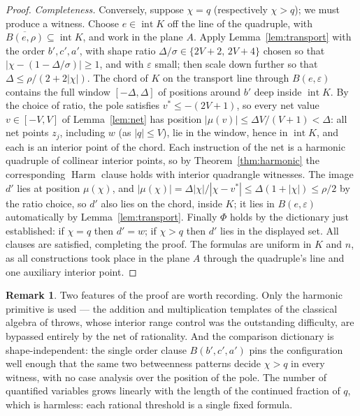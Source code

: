 \documentclass[11pt]{amsart}
\theoremstyle{definition}
\newtheorem{remark}[theorem]{Remark}
\newcommand{\Harm}{\operatorname{Harm}}
\newcommand{\interior}{\operatorname{int}}
\begin{document}
\begin{proof}
\emph{Completeness.} Conversely, suppose $\chi=q$ \textup(respectively
$\chi>q$\textup); we must produce a witness. Choose $e\in\interior K$ off the
line of the quadruple, with $\overline{B(e,\rho)}\subseteq\interior K$, and
work in the plane $A$. Apply Lemma~\ref{lem:transport} with the order
$b',c',a'$, with shape ratio $\Delta/\sigma\in\{2V+2,\,2V+4\}$ chosen so
that $|\chi-(1-\Delta/\sigma)|\ge1$, and with $\varepsilon$ small; then
scale down further so that $\Delta\le\rho/(2+2|\chi|)$. The chord of $K$
on the transport line through $B(e,\varepsilon)$ contains the full window
$[-\Delta,\Delta]$ of positions around $b'$ deep inside $\interior K$. By the
choice of ratio, the pole satisfies $v^{*}\le-(2V+1)$, so every net value
$v\in[-V,V]$ of Lemma~\ref{lem:net} has position
$|\mu(v)|\le\Delta V/(V+1)<\Delta$: all net points $z_j$, including $w$
\textup(as $|q|\le V$\textup), lie in the window, hence in $\interior K$,
and each is an interior point of the chord. Each instruction of the net is a
harmonic quadruple of collinear interior points, so by
Theorem~\ref{thm:harmonic} the corresponding $\Harm$ clause holds with
interior quadrangle witnesses. The image $d'$ lies at position $\mu(\chi)$,
and $|\mu(\chi)|=\Delta|\chi|/|\chi-v^{*}|\le\Delta(1+|\chi|)\le\rho/2$
by the ratio choice, so $d'$ also lies on the chord, inside $K$; it lies in
$B(e,\varepsilon)$ automatically by Lemma~\ref{lem:transport}. Finally
$\Phi$ holds by the dictionary just established: if $\chi=q$ then
$d'=w$; if $\chi>q$ then $d'$ lies in the displayed set. All clauses are
satisfied, completing the proof. The formulas are uniform in $K$ and $n$,
as all constructions took place in the plane $A$ through the quadruple's
line and one auxiliary interior point.
\end{proof}

\begin{remark}
Two features of the proof are worth recording. Only the harmonic primitive is
used --- the addition and multiplication templates of the classical algebra of
throws, whose interior range control was the outstanding difficulty, are
bypassed entirely by the net of rationality. And the comparison dictionary is
shape-independent: the single order clause $B(b',c',a')$ pins the
configuration well enough that the same two betweenness patterns decide
$\chi>q$ in every witness, with no case analysis over the position of the
pole. The number of quantified variables grows linearly with the length of
the continued fraction of $q$, which is harmless: each rational threshold is
a single fixed formula.
\end{remark}
\end{document}
